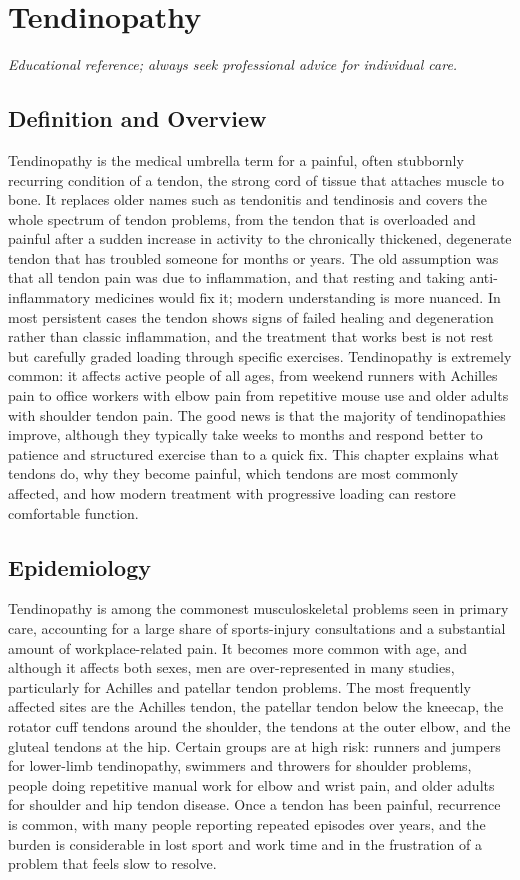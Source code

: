 \chapter{Tendinopathy}

\medskip
\noindent\textit{Educational reference; always seek professional advice for individual care.}

\section*{Definition and Overview}
Tendinopathy is the medical umbrella term for a painful, often stubbornly recurring condition of a tendon, the strong cord of tissue that attaches muscle to bone. It replaces older names such as tendonitis and tendinosis and covers the whole spectrum of tendon problems, from the tendon that is overloaded and painful after a sudden increase in activity to the chronically thickened, degenerate tendon that has troubled someone for months or years. The old assumption was that all tendon pain was due to inflammation, and that resting and taking anti-inflammatory medicines would fix it; modern understanding is more nuanced. In most persistent cases the tendon shows signs of failed healing and degeneration rather than classic inflammation, and the treatment that works best is not rest but carefully graded loading through specific exercises. Tendinopathy is extremely common: it affects active people of all ages, from weekend runners with Achilles pain to office workers with elbow pain from repetitive mouse use and older adults with shoulder tendon pain. The good news is that the majority of tendinopathies improve, although they typically take weeks to months and respond better to patience and structured exercise than to a quick fix. This chapter explains what tendons do, why they become painful, which tendons are most commonly affected, and how modern treatment with progressive loading can restore comfortable function.

\section*{Epidemiology}
Tendinopathy is among the commonest musculoskeletal problems seen in primary care, accounting for a large share of sports-injury consultations and a substantial amount of workplace-related pain. It becomes more common with age, and although it affects both sexes, men are over-represented in many studies, particularly for Achilles and patellar tendon problems. The most frequently affected sites are the Achilles tendon, the patellar tendon below the kneecap, the rotator cuff tendons around the shoulder, the tendons at the outer elbow, and the gluteal tendons at the hip. Certain groups are at high risk: runners and jumpers for lower-limb tendinopathy, swimmers and throwers for shoulder problems, people doing repetitive manual work for elbow and wrist pain, and older adults for shoulder and hip tendon disease. Once a tendon has been painful, recurrence is common, with many people reporting repeated episodes over years, and the burden is considerable in lost sport and work time and in the frustration of a problem that feels slow to resolve.

